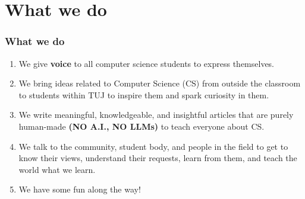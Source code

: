 \documentclass{beamer}
\begin{document}
\section{What we do}
\begin{frame}
    \frametitle{What we do}
        
        \begin{enumerate}
            \item<1-> We give \textbf{voice} to all computer science students to express themselves.
            
            \item<2-> We bring ideas related to Computer Science (CS) from outside the classroom to students within TUJ to inspire them and spark curiosity in them.

            \item<3-> We write meaningful, knowledgeable, and insightful articles that are purely human-made \textbf{(NO A.I., NO LLMs)} to teach everyone about CS.

            \item<4-> We talk to the community, student body, and people in the field to get to know their views, understand their requests, learn from them, and teach the world what we learn. 

            \item<5-> We have some fun along the way!

        \end{enumerate}

\end{frame}


\end{document}
